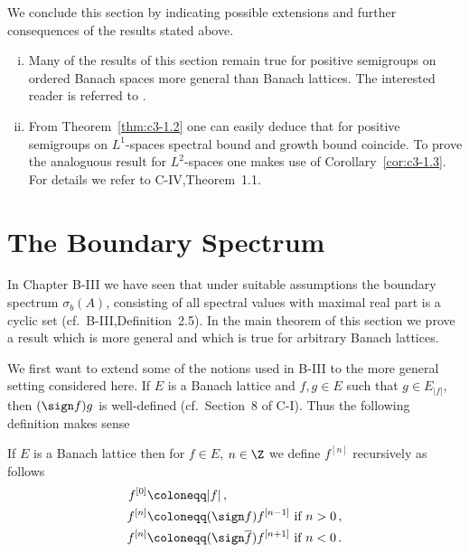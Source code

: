 We conclude this section by indicating possible extensions and further consequences of the results stated above.

\begin{remarks}\label{rem:c3-1.7}
\begin{enumerate}[(i), wide]
	\item 
	Many of the results of this section remain true for positive semigroups on ordered Banach spaces more general than Banach lattices.
	The interested reader is referred to \citet{greinervoigtwolff:1981}.
	
	\item 
	From Theorem~\ref{thm:c3-1.2} one can easily deduce that for positive semigroups on $L^1$-spaces spectral bound and growth bound coincide.
	To prove the analoguous result for $L^2$-spaces one makes use of Corollary~\ref{cor:c3-1.3}.
	For details we refer to C-IV,Theorem~1.1.
\end{enumerate}
\end{remarks}
%
\section{The Boundary Spectrum}\label{sec:c3-2}

In Chapter B-III we have seen that under suitable assumptions the boundary spectrum $\sigma_{b}(A)$, consisting of all spectral values with maximal real part is a cyclic set (cf.\ B-III,Definition~2.5).
In the main theorem of this section we prove a result which is more general and which is true for arbitrary Banach lattices.

We first want to extend some of the notions used in B-III to the more general setting considered here.
If $E$ is a Banach lattice and $f,g \in E$ such that $g \in E_{|f|}$, then $(\sign  f)g$ is well-defined (cf.\ Section~8 of C-I).
Thus the following definition makes sense
\begin{definition}\label{def:c3-2.1}
	If $E$ is a Banach lattice then for $f \in E$, $n \in \Z$ we define $f^{[n]}$ recursively as follows
	\begin{equation}\label{eq:c3-2.1}
	\begin{aligned}
		f^{[0]} &\coloneqq |f|\,, \\
		f^{[n]} &\coloneqq (\sign  f)f^{[n-1]} \text{ if } n > 0\,,\\
		f^{[n]} &\coloneqq (\sign  \overline{f})f^{[n+1]} \text{ if } n < 0\,.
	\end{aligned}
	\end{equation}
\end{definition}

